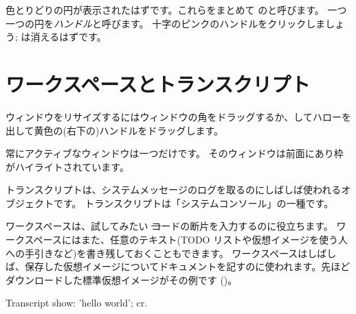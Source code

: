 \documentclass[a4paper,10pt,twoside]{book}
\begin{document}
色とりどりの円が表示されたはずです。これらをまとめて \bam のと呼びます。
一つ一つの円を\emph{ハンドル}と呼びます。
十字のピンクのハンドルをクリックしましょう; \bam は消えるはずです。

\section{ワークスペースとトランスクリプト}


ウィンドウをリサイズするにはウィンドウの角をドラッグするか、\metaclick してハローを出して黄色の(右下の)ハンドルをドラッグします。

常にアクティブなウィンドウは一つだけです。 そのウィンドウは前面にあり枠がハイライトされています。

トランスクリプトは、システムメッセージのログを取るのにしばしば使われるオブジェクトです。
トランスクリプトは「システムコンソール」の一種です。

ワークスペースは、試してみたい \st コードの断片を入力するのに役立ちます。
ワークスペースにはまた、任意のテキスト(TODO リストや仮想イメージを使う人への手引きなど)を書き残しておくこともできます。
ワークスペースはしばしば、保存した仮想イメージについてドキュメントを記すのに使われます。先ほどダウンロードした標準仮想イメージがその例です ()。

\begin{code}{}
Transcript show: 'hello world'; cr.
\end{code}
\end{document}
